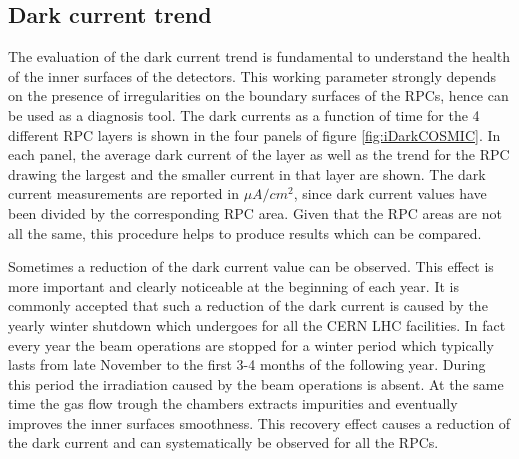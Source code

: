 \subsection{Dark current trend}
The evaluation of the dark current trend is fundamental to understand the health of the inner surfaces of the detectors.
This working parameter strongly depends on the presence of irregularities on the boundary surfaces of the RPCs, hence can be used as a diagnosis tool.
The dark currents as a function of time for the 4 different RPC layers is shown in the four panels of figure \ref{fig:iDarkCOSMIC}. 
In each panel, the average dark current of the layer as well as the trend for the RPC drawing the largest and the smaller current in that layer are shown.
The dark current measurements are reported in $\mu A/cm^2$, since dark current values have been divided by the corresponding RPC area.
Given that the RPC areas are not all the same, this procedure helps to produce results which can be compared.


Sometimes a reduction of the dark current value can be observed.
This effect is more important and clearly noticeable at the beginning of each year.
It is commonly accepted that such a reduction of the dark current is caused by the yearly winter shutdown which undergoes for all the CERN LHC facilities.
In fact every year the beam operations are stopped for a winter period which typically lasts from late November to the first 3-4 months of the following year.
During this period the irradiation caused by the beam operations is absent.
At the same time the gas flow trough the chambers extracts impurities and eventually improves the inner surfaces smoothness.
This recovery effect causes a reduction of the dark current and can systematically be observed for all the RPCs.

